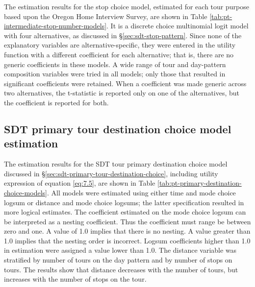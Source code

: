 The estimation results for the stop choice model, estimated for each tour purpose based upon the Oregon Home Interview Survey, are shown in Table \ref{tab:pt-intermediate-stop-number-models}. It is a discrete choice multinomial logit model with four alternatives, as discussed in \S\ref{sec:sdt-stop-pattern}. Since none of the explanatory variables are alternative-specific, they were entered in the utility function with a different coefficient for each alternative; that is, there are no generic coefficients in these models. A wide range of tour and day-pattern composition variables were tried in all models; only those that resulted in significant coefficients were retained. When a coefficient was made generic across two alternatives, the t-statistic is reported only on one of the alternatives, but the coefficient is reported for both.



\subsection{SDT primary tour destination choice model estimation}
The estimation results for the SDT tour primary destination choice model discussed in \S\ref{sec:sdt-primary-tour-destination-choice}, including utility expression of equation \ref{eq:7.5}, are shown in Table \ref{tab:pt-primary-destination-choice-models}. All models were estimated using either time and mode choice logsum or distance and mode choice logsums; the latter specification resulted in more logical estimates. The coefficient estimated on the mode choice logsum can be interpreted as a nesting coefficient. Thus the coefficient must range be between zero and one. A value of 1.0 implies that there is no nesting. A value greater than 1.0 implies that the nesting order is incorrect. Logsum coefficients higher than 1.0 in estimation were assigned a value lower than 1.0. The distance variable was stratified by number of tours on the day pattern and by number of stops on tours. The results show that distance decreases with the number of tours, but increases with the number of stops on the tour.

